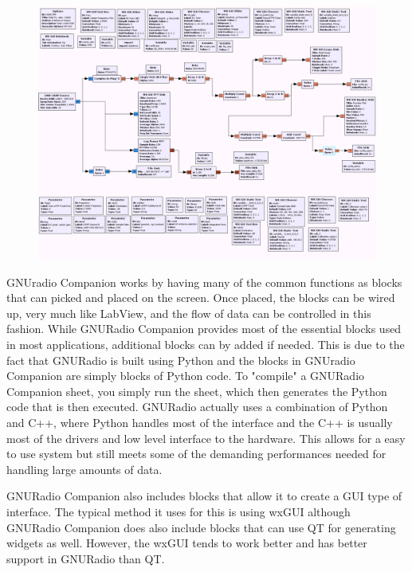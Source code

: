 {\begin{figure}[h!tb] 
\centering
\includegraphics[width=17cm]{Images/N200_radiometer_grc.png}
\label{N200_GRC}
\end{figure}
}

GNUradio Companion works by having many of the common functions as blocks that can picked and placed on the screen.  Once placed, the blocks can be wired up, very much like LabView, and the flow of data can be controlled in this fashion.  While GNURadio Companion provides most of the essential blocks used in most applications, additional blocks can by added if needed.  This is due to the fact that GNURadio is built using Python and the blocks in GNUradio Companion are simply blocks of Python code.  To "compile" a GNURadio Companion sheet, you simply run the sheet, which then generates the Python code that is then executed.  GNURadio actually uses a combination of Python and C++, where Python handles most of the interface and the C++ is usually most of the drivers and low level interface to the hardware.  This allows for a easy to use system but still meets some of the demanding performances needed for handling large amounts of data.  

GNURadio Companion also includes blocks that allow it to create a GUI type of interface.  The typical method it uses for this is using wxGUI although GNURadio Companion does also include blocks that can use QT for generating widgets as well.  However, the wxGUI tends to work better and has better support in GNURadio than QT.  

